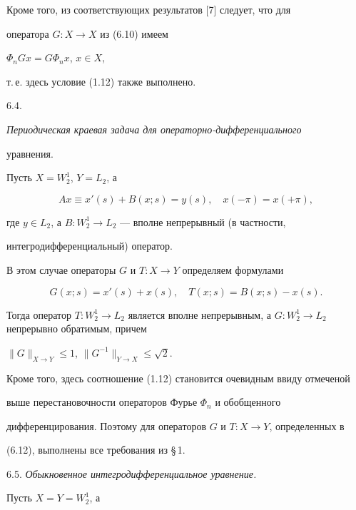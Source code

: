 Кроме того, из соответствующих результатов [7] следует, что для


оператора $G:X\to X$ из (6.10) имеем


$\Phi_nGx=G\Phi_n x$, $x\in X$,


т.\,е. здесь условие (1.12) также выполнено.


\smallskip





6.4. {\it Периодическая краевая задача для операторно-дифференциального


уравнения.} Пусть $X=W_2^1$, $Y=L_2$, а


\begin{equation}


Ax \equiv x'(s)+B(x;s)=y(s),\quad x(-\pi)=x(+\pi),


\end{equation}


где $y \in L_2$, а $B:W_2^1\to L_2$ --- вполне непрерывный (в частности,


интегродифференциальный) оператор.





В этом случае операторы $G$ и $T:X\to Y$ определяем формулами


\begin{equation}


G(x;s)=x'(s)+x(s),\quad T(x;s)=B(x;s)-x(s).


\end{equation}


Тогда оператор $T:W_2^1\to L_2$ является вполне непрерывным, а $G:W_2^1\to


L_2$ непрерывно обратимым, причем


$\|G\|_{X\to Y}\le 1$, $\|G^{-1}\|_{Y\to X}\le \sqrt{2}$.


Кроме того, здесь соотношение (1.12) становится очевидным ввиду отмеченой


выше перестановочности операторов Фурье $\Phi_n$ и обобщенного


дифференцирования. Поэтому для операторов $G$ и $T:X\to Y$, определенных в


(6.12), выполнены все требования из \S\,1.


\smallskip





6.5. {\it Обыкновенное интегродифференциальное уравнение.} 


Пусть $X=Y=W_2^1$, а


